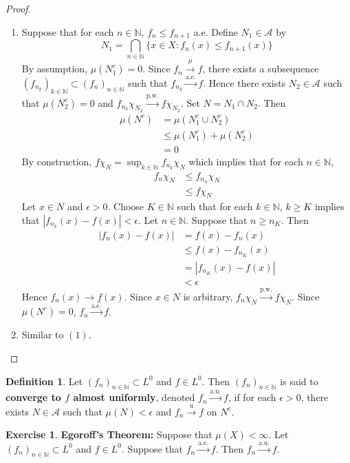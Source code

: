 \documentclass[12pt]{amsart}
\theoremstyle{definition}
\newtheorem{defn}[definition]{Definition}
\newtheorem{ex}[definition]{Exercise}
\newcommand{\ep}{\epsilon}
\newcommand{\N}{\mathbb{N}}
\newcommand{\MA}{\mathcal{A}}
\newcommand{\convt}[1]{\xrightarrow{\text{#1}}}
\newcommand{\conv}[1]{\xrightarrow{#1}}
\newcommand{\lex}[1]{\label{ex:#1}}
\newcommand{\ld}[1]{\label{defn:#1}}
\begin{document}
	\begin{proof}\
		\begin{enumerate}
			\item Suppose that for each $n \in \N$, $f_n \leq f_{n+1}$ a.e. Define $N_1 \in \MA$ by 
			$$N_1 = \bigcap_{n \in \N} \{x \in X: f_n(x) \leq f_{n+1}(x)\}$$ 
			By assumption, $\mu(N_1^c) = 0$. Since $f_n \conv{\mu} f$, there exists a subsequence $(f_{n_k})_{k \in \N} \subset (f_n)_{n \in \N}$ such that $f_{n_k} \convt{a.e.} f$. Hence there exists $N_2 \in \MA$ such that $\mu(N_2^c) = 0$ and $f_{n_k} \chi_{N_2} \convt{p.w.} f \chi_{N_2}$. Set $N = N_1 \cap N_2$. Then 
			\begin{align*}
				\mu(N^c)
				& = \mu(N_1^c \cup N_2^c) \\
				& \leq \mu(N_1^c) + \mu(N_2^c) \\
				& = 0
			\end{align*}
			By construction, $f \chi_N = \sup_{k \in \N} f_{n_k} \chi_N$ which implies that for each $n \in \N$, 
			\begin{align*}
				f_n \chi_N
				& \leq f_{n_n} \chi_N \\ 
				& \leq f \chi_N
			\end{align*}
			Let $x \in N$ and $\ep > 0$. Choose $K \in \N$ such that for each $k \in \N$, $k \geq K$ implies that $|f_{n_k}(x) - f(x)| < \ep$. Let $n \in \N$. Suppose that $n \geq n_K$. Then 
			\begin{align*}
				|f_{n}(x) - f(x)|
				& = f(x) - f_{n}(x) \\
				& \leq f(x) - f_{n_K}(x) \\
				& = |f_{n_K}(x) - f(x)| \\
				& < \ep 
			\end{align*}
			Hence $f_n(x) \rightarrow f(x)$. Since $x \in N$ is arbitrary, $f_n \chi_N \convt{p.w.} f \chi_N$. Since $\mu(N^c) = 0$, $f_n \convt{a.e.} f$.
			\item Similar to $(1)$. 
		\end{enumerate}
	\end{proof}
	
	
	\begin{defn} \ld{35004} 
		 Let $(f_n)_{n \in \N} \subset L^0$ and $f \in L^0$. Then $(f_n)_{n \in \N}$ is said to \textbf{converge to $f$ almost uniformly}, denoted $f_n \xrightarrow{\text{a.u.}} f$, if for each $\ep >0$, there exists $N \in \MA$ such that $\mu(N) < \ep$ and $f_n \convt{u} f$ on $N^c$. 
	\end{defn}	
	
	\begin{ex} \lex{35005} \textbf{Egoroff's Theorem:}
		Suppose that $\mu(X) < \infty$. Let $(f_n)_{n \in \N} \subset L^0$ and $f \in L^0$. Suppose that $f_n \convt{a.e.} f$. Then $f_n \convt{a.u.} f$.
	\end{ex}
	
\end{document}
